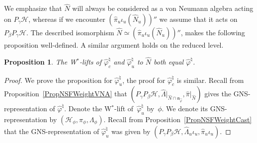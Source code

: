 \documentclass[pdftex]{sigma}
\numberwithin{equation}{section}
\newtheorem{prop}[thm]{Proposition}
\theoremstyle{definition}
\newcommand{\cHil}{\mathcal{H}}
\begin{document}
We emphasize that $\hat{N}$ will always be considered as a von Neumann algebra acting on $P_\gamma \cHil$, whereas if we encounter $(\hat{\pi}_u\iota_u(\hat{N}_u)) ''$ we assume that it acts on $P_\beta P_\gamma \cHil$. The described isomorphism $\hat{N} \simeq (\hat{\pi}_u\iota_u(\hat{N}_u)) ''$, makes the following proposition well-def\/ined. A similar argument holds on the reduced level.

\begin{prop}\label{PropWAstLift}
The W$^\ast$-lifts of $\hat{\varphi}_{c}^\natural$ and $\hat{\varphi}_{u}^\natural$   to $\hat{N}$ both equal  $\hat{\varphi}^\natural$.
\end{prop}

\begin{proof}
We prove the proposition for $\hat{\varphi}_{u}^\natural$, the proof for $\hat{\varphi}_{c}^\natural$ is similar.
 Recall from Proposition~\ref{PropNSFWeightVNA} that $(P_\gamma P_\beta \cHil,   \hat{\Lambda}\vert_{\hat{N} \cap \mathfrak{n}_{\hat{\varphi}}} , \hat{\pi}\vert_{\hat{N}})$ gives the GNS-representation of $\hat{\varphi}^\natural$.
Denote the W$^\ast$-lift of~$\hat{\varphi}_{u}^\natural$ by~$\phi$. We denote its GNS-representation by $(\cHil_\phi, \pi_\phi, \Lambda_\phi)$. Recall from Proposition~\ref{PropNSFWeightCast} that the GNS-representation of $\hat{\varphi}_u^\natural$ was given by  $(P_\gamma P_\beta \cHil, \hat{\Lambda}_{u}  \iota_u, \hat{\pi}_{u}  \iota_u )$.


\end{proof}
\end{document}
